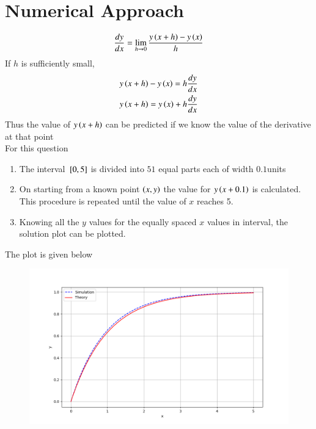 \documentclass[journal,12pt,onecolumn]{IEEEtran}
\theoremstyle{remark}
\begin{document}
\section{Numerical Approach}
\begin{align*}
\frac{dy}{dx}=\lim_{h \rightarrow 0} \frac{y\left(x+h\right)-y\left(x\right)}{h}
\end{align*}
If $h$ is sufficiently small,\\
\begin{align*}
    y\left(x+h\right)-y\left(x\right)=h\frac{dy}{dx}\\
    y\left(x+h\right)=y\left(x\right)+h\frac{dy}{dx}
\end{align*}
Thus the value of $y\left(x+h\right)$ can be predicted if we know the value of the derivative at that point\\
For this question 
\begin{enumerate}
    \item The interval ${}\left[0,5\right]$ is divided  into $51$ equal parts each of width $0.1$units
    \item On starting from a known point $\left(x,y\right)$ the value for $y\left(x+0.1\right)$ is calculated. This procedure is repeated until the value of $x$ reaches 5.
    \item Knowing all the $y$ values for the equally spaced $x$ values in interval, the solution plot can be plotted.
\end{enumerate}
\newpage
The plot is given below\\
\begin{figure}[h!]
    \centering
    \includegraphics[width=0.7\columnwidth]{figs/Q1.png}
    \label{stemplot}
\end{figure}
\end{document}
